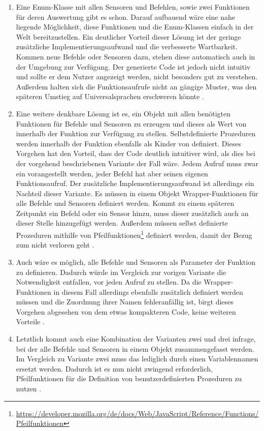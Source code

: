 \begin{enumerate}
  \item Eine Enum-Klasse mit allen Sensoren und Befehlen, sowie zwei Funktionen für deren Auswertung gibt es schon. Darauf aufbauend wäre eine nahe liegende Möglichkeit, diese Funktionen und die Enum-Klassen einfach in der Welt bereitzustellen. Ein deutlicher Vorteil dieser Lösung ist der geringe zusätzliche Implementierungsaufwand und die verbesserte Wartbarkeit. Kommen neue Befehle oder Sensoren dazu, stehen diese automatisch auch in der Umgebung zur Verfügung. Der generierte Code ist jedoch nicht intuitiv und sollte er dem Nutzer angezeigt werden, nicht besonders gut zu verstehen. Außerdem halten sich die Funktionsaufrufe nicht an gängige Muster, was den späteren Umstieg auf Universalsprachen erschweren könnte .
  \item Eine weitere denkbare Lösung ist es, ein Objekt mit allen benötigten Funktionen für Befehle und Sensoren zu erzeugen und dieses als Wert von  innerhalb der Funktion zur Verfügung zu stellen. Selbstdefinierte Prozeduren werden innerhalb der Funktion ebenfalls als Kinder von  definiert. Dieses Vorgehen hat den Vorteil, dass der Code deutlich intuitiver wird, als dies bei der vorgehend beschriebenen Variante der Fall wäre. Jedem Aufruf muss zwar ein  vorangestellt werden, jeder Befehl hat aber seinen eigenen Funktionsaufruf. Der zusätzliche Implementierungsaufwand ist allerdings ein Nachteil dieser Variante. Es müssen in einem Objekt Wrapper-Funktionen für alle Befehle und Sensoren definiert werden. Kommt zu einem späteren Zeitpunkt ein Befehl oder ein Sensor hinzu, muss dieser zusätzlich auch an dieser Stelle hinzugefügt werden. Außerdem müssen selbst definierte Prozeduren mithilfe von Pfeilfunktionen\footnote{\url{https://developer.mozilla.org/de/docs/Web/JavaScript/Reference/Functions/Pfeilfunktionen}} definiert werden, damit der Bezug zum  nicht verloren geht .
  \item Auch wäre es möglich, alle Befehle und Sensoren als Parameter der Funktion zu definieren. Dadurch würde im Vergleich zur vorigen Variante die Notwendigkeit entfallen,  vor jeden Aufruf zu stellen. Da die Wrapper-Funktionen in diesem Fall allerdings ebenfalls zusätzlich definiert werden müssen und die Zuordnung ihrer Namen fehleranfällig ist, birgt dieses Vorgehen abgesehen von dem etwas kompakteren Code, keine weiteren Vorteile .
  \item Letztlich kommt auch eine Kombination der Varianten zwei und drei infrage, bei der alle Befehle und Sensoren in einem Objekt zusammengefasst werden. Im Vergleich zu Variante zwei muss das  lediglich durch einen Variablennamen ersetzt werden. Dadurch ist es nun nicht zwingend erforderlich, Pfeilfunktionen für die Definition von benutzerdefinierten Prozeduren zu nutzen .
\end{enumerate}

